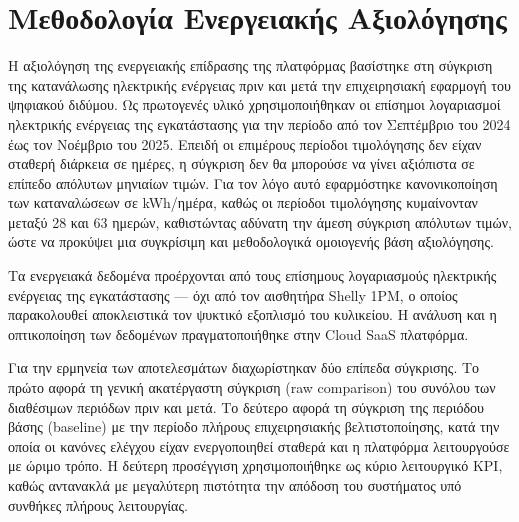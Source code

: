 \section{Μεθοδολογία Ενεργειακής Αξιολόγησης}
Η αξιολόγηση της ενεργειακής επίδρασης της πλατφόρμας βασίστηκε στη σύγκριση της κατανάλωσης ηλεκτρικής ενέργειας πριν και μετά την επιχειρησιακή εφαρμογή του ψηφιακού διδύμου. Ως πρωτογενές υλικό χρησιμοποιήθηκαν οι επίσημοι λογαριασμοί ηλεκτρικής ενέργειας της εγκατάστασης για την περίοδο από τον Σεπτέμβριο του 2024 έως τον Νοέμβριο του 2025. Επειδή οι επιμέρους περίοδοι τιμολόγησης δεν είχαν σταθερή διάρκεια σε ημέρες, η σύγκριση δεν θα μπορούσε να γίνει αξιόπιστα σε επίπεδο απόλυτων μηνιαίων τιμών. Για τον λόγο αυτό εφαρμόστηκε κανονικοποίηση των καταναλώσεων σε \textlatin{kWh}/ημέρα, καθώς οι περίοδοι τιμολόγησης κυμαίνονταν μεταξύ 28 και 63 ημερών, καθιστώντας αδύνατη την άμεση σύγκριση απόλυτων τιμών, ώστε να προκύψει μια συγκρίσιμη και μεθοδολογικά ομοιογενής βάση αξιολόγησης.

Τα ενεργειακά δεδομένα προέρχονται από τους επίσημους λογαριασμούς ηλεκτρικής ενέργειας της εγκατάστασης --- όχι από τον αισθητήρα \textlatin{Shelly 1PM}, ο οποίος παρακολουθεί αποκλειστικά τον ψυκτικό εξοπλισμό του κυλικείου. Η ανάλυση και η οπτικοποίηση των δεδομένων πραγματοποιήθηκε στην \textlatin{Cloud SaaS} πλατφόρμα.

Για την ερμηνεία των αποτελεσμάτων διαχωρίστηκαν δύο επίπεδα σύγκρισης. Το πρώτο αφορά τη γενική ακατέργαστη σύγκριση (\textlatin{raw comparison}) του συνόλου των διαθέσιμων περιόδων πριν και μετά. Το δεύτερο αφορά τη σύγκριση της περιόδου βάσης (\textlatin{baseline}) με την περίοδο πλήρους επιχειρησιακής βελτιστοποίησης, κατά την οποία οι κανόνες ελέγχου είχαν ενεργοποιηθεί σταθερά και η πλατφόρμα λειτουργούσε με ώριμο τρόπο. Η δεύτερη προσέγγιση χρησιμοποιήθηκε ως κύριο λειτουργικό \textlatin{KPI}, καθώς αντανακλά με μεγαλύτερη πιστότητα την απόδοση του συστήματος υπό συνθήκες πλήρους λειτουργίας.


